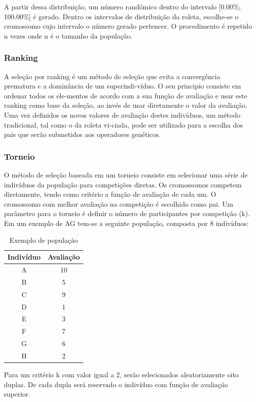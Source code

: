 \documentclass[twoside]{article}
\begin{document}
\begin{multicols}{2}
A partir dessa distribuição, um número randômico dentro do intervalo [0.00\%; 100.00\%] é gerado. Dentro os intervalos de distribuição da roleta, escolhe-se o cromossomo cujo intervalo o número gerado pertencer. O procedimento é repetido n vezes onde n é o tamanho da população.

\subsubsection{Ranking}
A seleção por ranking é um método de seleção que evita a convergência prematura e a dominância de um superindi-víduo. O seu principio consiste em ordenar todos os ele-mentos de acordo com a sua função de avaliação e usar este ranking como base da seleção, ao invés de usar diretamente o valor da avaliação. Uma vez definidos os novos valores de avaliação destes indivíduos, um método tradicional, tal como o da roleta vi-ciada, pode ser utilizado para a escolha dos pais que serão submetidos aos operadores genéticos.


\subsubsection{Torneio}
O método de seleção baseada em um torneio consiste em selecionar uma série de indivíduos da população para competições diretas. Os cromossomos competem diretamente, tendo como critério a função de avaliação de cada um. O cromossomo com melhor avaliação na competição é escolhido como pai. Um parâmetro para o torneio é definir o número de participantes por competição (k).
Em um exemplo de AG tem-se a seguinte população, composta por 8 indivíduos:

\begin{table}[H]
\label{tab:popinfo}
\caption{Exemplo de população}
\centering
\begin{tabular}{cc}
\toprule
Indivíduo & Avaliação\\
\midrule
A & 10\\
B & 5\\
C & 9\\
D & 1\\
E & 3\\
F & 7\\
G & 6\\
H & 2\\
\bottomrule
\end{tabular}
\end{table}

Para um critério k com valor igual a 2, serão selecionados aleatoriamente oito duplas. De cada dupla será reservado o indivíduo com função de avaliação superior.


\end{multicols}
\end{document}
